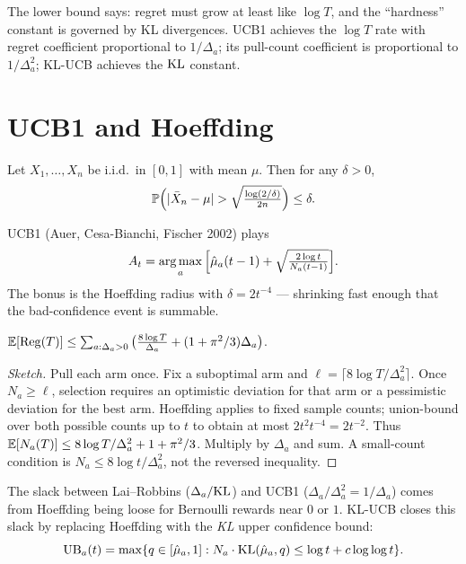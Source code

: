 \documentclass[11pt,oneside]{scrbook}
\newcommand{\Reg}{\mathrm{Reg}}
\begin{document}
The lower bound says: regret must grow at least like $\log T$, and the
``hardness'' constant is governed by KL divergences. UCB1 achieves the $\log T$ rate with regret coefficient proportional to
$1/\Delta_a$; its pull-count coefficient is proportional to $1/\Delta_a^2$;
KL-UCB achieves the $\mathrm{KL}$ constant.

\section{UCB1 and Hoeffding}

\begin{theorem}
Let $X_1,\dots,X_n$ be i.i.d.\ in $[0,1]$ with mean $\mu$. Then for any $\delta>0$,
\[
\mathbb{P}\Big(|\bar X_n - \mu| > \sqrt{\tfrac{\log(2/\delta)}{2n}}\Big) \leq \delta.
\]
\end{theorem}

UCB1 (Auer, Cesa-Bianchi, Fischer 2002) plays
\[
A_t = \operatorname*{arg\,max}_a \Big[\hat\mu_a(t-1) + \sqrt{\tfrac{2\log t}{N_a(t-1)}}\Big].
\]
The bonus is the Hoeffding radius with $\delta = 2 t^{-4}$ --- shrinking
fast enough that the bad-confidence event is summable.

\begin{theorem}
$\E[\Reg(T)] \leq \sum_{a:\Delta_a > 0} \big(\tfrac{8 \log T}{\Delta_a} + (1 + \pi^2/3)\Delta_a\big)$.
\end{theorem}

\begin{proof}[Sketch]
Pull each arm once. Fix a suboptimal arm and
$\ell=\lceil8\log T/\Delta_a^2\rceil$. Once $N_a\ge\ell$,
selection requires an optimistic deviation for that arm or a pessimistic
deviation for the best arm. Hoeffding applies to fixed sample counts;
union-bound over both possible counts up to $t$ to obtain at most
$2t^2t^{-4}=2t^{-2}$. Thus
$\mathbb{E}[N_a(T)]\le8\log T/\Delta_a^2+1+\pi^2/3$.
Multiply by $\Delta_a$ and sum. A small-count condition is
$N_a\le8\log t/\Delta_a^2$, not the reversed inequality.
\end{proof}

\begin{remark}
The slack between Lai--Robbins ($\Delta_a / \mathrm{KL}$) and UCB1 ($\Delta_a/\Delta_a^2
= 1/\Delta_a$) comes from Hoeffding being loose for Bernoulli rewards near
$0$ or $1$. KL-UCB closes this slack by replacing Hoeffding with the
\emph{KL} upper confidence bound:
\[
\mathrm{UB}_a(t) = \max\{q \in [\hat\mu_a, 1] : N_a \cdot \mathrm{KL}(\hat\mu_a, q) \leq \log t + c \log\log t\}.
\]
\end{remark}
\end{document}
